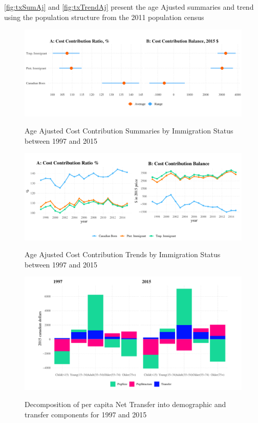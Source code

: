 \autoref{fig:txSumAj} and \autoref{fig:txTrendAj} present the age Ajusted summaries and trend using the population structure from the 2011 population census
  \begin{figure}[H]%
    \caption{Age Ajusted Cost Contribution Summaries by Immigration Status between 1997 and 2015}
    \includegraphics[width=1\textwidth]{./res/txSumAj.png}%
    \label{fig:txSumAj}%
\end{figure}%



  \begin{figure}[H]%
    \caption{Age Ajusted Cost Contribution Trends by Immigration Status between 1997 and 2015}
    \includegraphics[width=1\textwidth]{./res/txTrendAj.pdf}%
    \label{fig:txTrendAj}%
\end{figure}%




    \begin{figure}[H]%
      \caption{Decomposition of per capita Net Transfer into demographic and transfer components for 1997 and 2015}
      \includegraphics[width=1\textwidth]{./res/txb17_15.pdf}%
      \label{fig:txb17_15}%
  \end{figure}%



